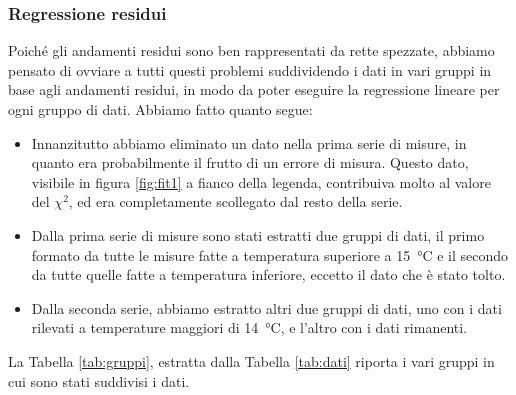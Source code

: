 \subsubsection{Regressione residui}

Poiché gli andamenti residui sono ben rappresentati da rette spezzate, abbiamo pensato di ovviare a tutti questi problemi suddividendo i
dati in vari gruppi in base agli andamenti residui, in modo da poter eseguire la regressione lineare per ogni gruppo di dati.
Abbiamo fatto quanto segue:

\label{sottoserie}
\begin{itemize}
    \item{Innanzitutto abbiamo eliminato un dato nella prima serie di misure, in quanto era probabilmente il frutto di un
        errore di misura. Questo dato, visibile in figura \ref{fig:fit1} a fianco della legenda,
        contribuiva molto al valore del $\chi^2$, ed era completamente scollegato dal resto della serie.}
    \item{Dalla prima serie di misure sono stati estratti due gruppi di dati, il primo formato da tutte le misure fatte
        a temperatura superiore a \SI{15}{\celsius} e il secondo da tutte quelle fatte a temperatura inferiore, eccetto
        il dato che è stato tolto.}
    \item{Dalla seconda serie, abbiamo estratto altri due gruppi di dati, uno con i dati rilevati a temperature maggiori di
        \SI{14}{\celsius}, e l'altro con i dati rimanenti.}
\end{itemize}

La Tabella \ref{tab:gruppi}, estratta dalla Tabella \ref{tab:dati} riporta i vari gruppi in cui sono stati suddivisi i dati.

